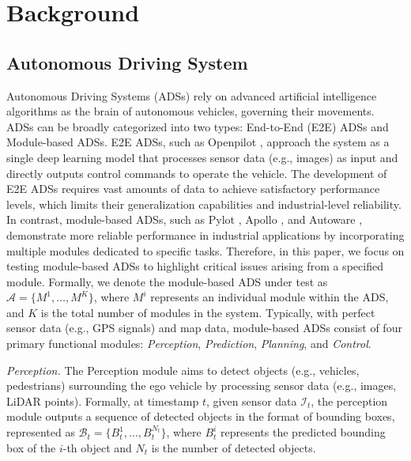 \section{Background}\label{sec: Background}

\subsection{Autonomous Driving System}\label{sec: Background-ads}
Autonomous Driving Systems (ADSs) rely on advanced artificial intelligence algorithms as the brain of autonomous vehicles, governing their movements. ADSs can be broadly categorized into two types: End-to-End (E2E) ADSs and Module-based ADSs.
E2E ADSs, such as Openpilot \cite{openpilot}, approach the system as a single deep learning model that processes sensor data (e.g., images) as input and directly outputs control commands to operate the vehicle. The development of E2E ADSs requires vast amounts of data to achieve satisfactory performance levels, which limits their generalization capabilities and industrial-level reliability.
In contrast, module-based ADSs, such as Pylot \cite{gog2021pylot}, Apollo \cite{baiduapollo}, and Autoware \cite{Autoware}, demonstrate more reliable performance in industrial applications by incorporating multiple modules dedicated to specific tasks. Therefore, in this paper, we focus on testing module-based ADSs to highlight critical issues arising from a specified module. 
Formally, we denote the module-based ADS under test as $\mathcal{A} = \{{M}^{1}, \ldots, {M}^{K}\}$, where ${M}^{{i}}$ represents an individual module within the ADS, and $K$ is the total number of modules in the system.
Typically, with perfect sensor data (e.g., GPS signals) and map data, module-based ADSs consist of four primary functional modules: \textit{Perception}, \textit{Prediction}, \textit{Planning}, and \textit{Control}.

\textit{Perception.} 
The Perception module aims to detect objects (e.g., vehicles, pedestrians) surrounding the ego vehicle by processing sensor data (e.g., images, LiDAR points). Formally, at timestamp $t$, given sensor data $\mathcal{I}_{t}$, the perception module outputs a sequence of detected objects in the format of bounding boxes, represented as $\mathcal{B}_{t} = \{B_{t}^{1}, \ldots, B_{t}^{N_{t}}\}$, where $B_{t}^{i}$ represents the predicted bounding box of the $i$-th object and $N_{t}$ is the number of detected objects.

